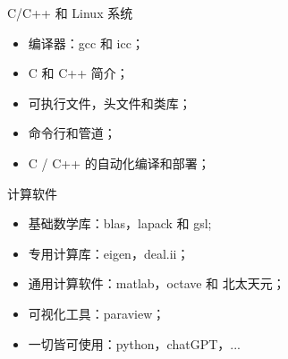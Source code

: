 \documentclass{beamer}
\begin{document}
\begin{frame}{C/C++ 和 Linux 系统}
  \begin{itemize}
  \item<1-> 编译器：gcc 和 icc；
  \item<2-> C 和 C++ 简介；
  \item<3-> 可执行文件，头文件和类库；
  \item<4-> 命令行和管道；
  \item<5-> C / C++ 的自动化编译和部署；
  \end{itemize}
\end{frame}

\begin{frame}{计算软件}
  \begin{itemize}
  \item<1-> 基础数学库：blas，lapack 和 gsl;
  \item<2-> 专用计算库：eigen，deal.ii； 
  \item<3-> 通用计算软件：matlab，octave 和 北太天元；
  \item<4-> 可视化工具：paraview；
  \item<5-> 一切皆可使用：python，chatGPT，...
  \end{itemize}
\end{frame}
\end{document}
